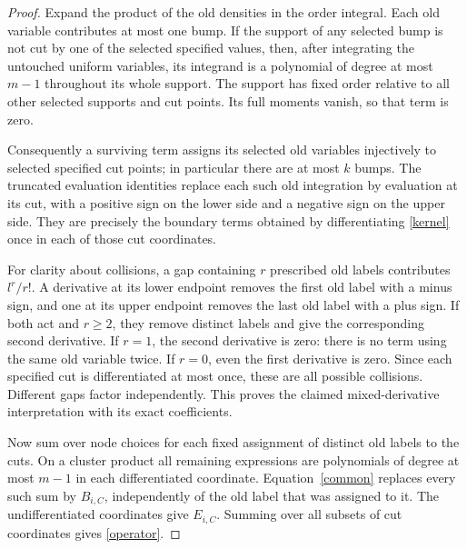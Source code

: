\documentclass[11pt]{article}
\begin{document}
\begin{proof}
Expand the product of the old densities in the order integral.
Each old variable contributes at most one bump. If the support of any
selected bump is not cut by one of the selected specified values, then,
after integrating the untouched uniform variables, its integrand is a
polynomial of degree at most $m-1$ throughout its whole support.
The support has fixed order relative to all other selected supports
and cut points. Its full moments vanish, so that term is zero.

Consequently a surviving term assigns its selected old variables
injectively to selected specified cut points; in particular there
are at most $k$ bumps. The truncated evaluation identities replace
each such old integration by evaluation at its cut, with a positive
sign on the lower side and a negative sign on the upper side.
They are precisely the boundary terms obtained by differentiating
\eqref{kernel} once in each of those cut coordinates.

For clarity about collisions, a gap containing $r$ prescribed old
labels contributes $l^r/r!$. A derivative at its lower endpoint
removes the first old label with a minus sign, and one at its upper
endpoint removes the last old label with a plus sign. If both act
and $r\ge2$, they remove distinct labels and give the corresponding
second derivative. If $r=1$, the second derivative is zero: there
is no term using the same old variable twice. If $r=0$, even the
first derivative is zero. Since each specified cut is differentiated
at most once, these are all possible collisions. Different gaps
factor independently. This proves the claimed mixed-derivative
interpretation with its exact coefficients.

Now sum over node choices for each fixed assignment of distinct
old labels to the cuts. On a cluster product all remaining expressions
are polynomials of degree at most $m-1$ in each differentiated
coordinate. Equation~\eqref{common} replaces every such sum by
$B_{i,C}$, independently of the old label that was assigned to it.
The undifferentiated coordinates give $E_{i,C}$. Summing over all
subsets of cut coordinates gives \eqref{operator}.
\end{proof}
\end{document}
